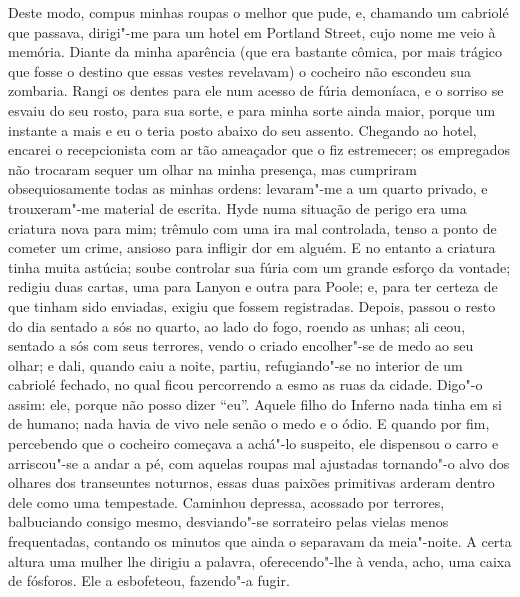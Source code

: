 Deste modo, compus minhas roupas o melhor que pude, e, chamando um
cabriolé que passava, dirigi"-me para um hotel em Portland Street, cujo
nome me veio à memória.  Diante da minha aparência (que era bastante
cômica, por mais trágico que fosse o destino que essas vestes
revelavam) o cocheiro não escondeu sua zombaria.  Rangi os dentes para
ele num acesso de fúria demoníaca, e o sorriso se esvaiu do seu rosto,
para sua sorte, e para minha sorte ainda maior, porque um instante a
mais e eu o teria posto abaixo do seu assento.  Chegando ao hotel,
encarei o recepcionista com ar tão ameaçador que o fiz estremecer; os
empregados não trocaram sequer um olhar na minha presença, mas
cumpriram obsequiosamente todas as minhas ordens: levaram"-me a um
quarto privado, e trouxeram"-me material de escrita.  Hyde numa situação
de perigo era uma criatura nova para mim; trêmulo com uma ira mal
controlada, tenso a ponto de cometer um crime, ansioso para infligir
dor em alguém.  E no entanto a criatura tinha muita astúcia; soube
controlar sua fúria com um grande esforço da vontade; redigiu duas
cartas, uma para Lanyon e outra para Poole; e, para ter certeza de que
tinham sido enviadas, exigiu que fossem registradas.  Depois, passou o
resto do dia sentado a sós no quarto, ao lado do fogo, roendo as unhas;
 ali ceou, sentado a sós com seus terrores, vendo o criado encolher"-se
de medo ao seu olhar; e dali, quando caiu a noite, partiu,
refugiando"-se no interior de um cabriolé fechado, no qual ficou
percorrendo a esmo as ruas da cidade.  Digo"-o assim: ele, porque não
posso dizer “eu”.  Aquele filho do Inferno nada tinha em si de humano;
nada havia de vivo nele senão o medo e o ódio.  E quando por fim,
percebendo que o cocheiro começava a achá"-lo suspeito, ele dispensou o
carro e arriscou"-se a andar a pé, com aquelas roupas mal ajustadas
tornando"-o alvo dos olhares dos transeuntes noturnos, essas duas
paixões primitivas arderam dentro dele como uma tempestade.  Caminhou
depressa, acossado por terrores, balbuciando consigo mesmo,
desviando"-se sorrateiro pelas vielas menos frequentadas, contando os
minutos que ainda o separavam da meia"-noite.  A certa altura uma mulher
lhe dirigiu a palavra, oferecendo"-lhe à venda, acho, uma caixa de
fósforos. Ele a esbofeteou, fazendo"-a fugir.

